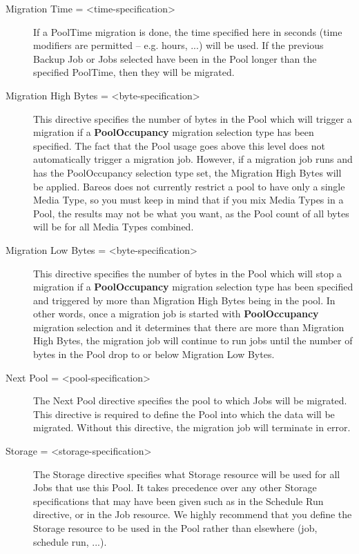 \begin{description}
\item [Migration Time = {\textless}time-specification{\textgreater}]
   If a PoolTime migration is done, the time specified here in seconds (time
   modifiers are permitted -- e.g. hours, ...) will be used. If the
   previous Backup Job or Jobs selected have been in the Pool longer than
   the specified PoolTime, then they will be migrated.

\item [Migration High Bytes =  {\textless}byte-specification{\textgreater}]
   This directive specifies the number of bytes in the Pool which will
   trigger a migration if a {\bf PoolOccupancy} migration selection
   type has been specified. The fact that the Pool
   usage goes above this level does not automatically trigger a migration
   job. However, if a migration job runs and has the PoolOccupancy selection
   type set, the Migration High Bytes will be applied.  Bareos does not
   currently restrict a pool to have only a single Media Type, so you
   must keep in mind that if you mix Media Types in a Pool, the results
   may not be what you want, as the Pool count of all bytes will be
   for all Media Types combined.

\item [Migration Low Bytes = {\textless}byte-specification{\textgreater}]
   This directive specifies the number of bytes in the Pool which will
   stop a migration if a {\bf PoolOccupancy} migration selection
   type has been specified and triggered by more than Migration High
   Bytes being in the pool. In other words, once a migration job
   is started with {\bf PoolOccupancy} migration selection and it
   determines that there are more than Migration High Bytes, the
   migration job will continue to run jobs until the number of
   bytes in the Pool drop to or below Migration Low Bytes.

\item [Next Pool = {\textless}pool-specification{\textgreater}]
   The Next Pool directive specifies the pool to which Jobs will be
   migrated. This directive is required to define the Pool into which
   the data will be migrated. Without this directive, the migration job
   will terminate in error.

\item [Storage = {\textless}storage-specification{\textgreater}]
   The Storage directive specifies what Storage resource will be used
   for all Jobs that use this Pool. It takes precedence over any other
   Storage specifications that may have been given such as in the
   Schedule Run directive, or in the Job resource.  We highly recommend
   that you define the Storage resource to be used in the Pool rather
   than elsewhere (job, schedule run, ...).
\end{description}

